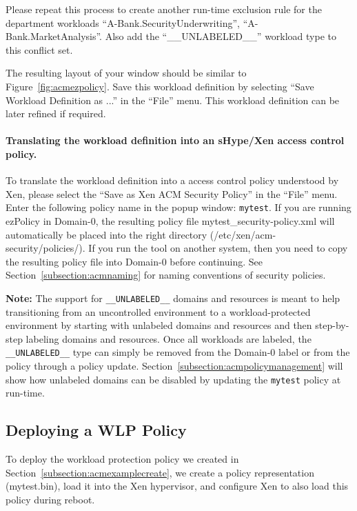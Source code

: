 \documentclass[11pt,twoside,final,openright]{report}
\begin{document}
Please repeat this process to create another run-time exclusion rule
for the department workloads ``A-Bank.SecurityUnderwriting'',
``A-Bank.MarketAnalysis''. Also add the ``\_\_UNLABELED\_\_''
workload type to this conflict set.

The resulting layout of your window should be similar to
Figure~\ref{fig:acmezpolicy}. Save this workload definition by
selecting ``Save Workload Definition as ...'' in the ``File'' menu.
This workload definition can be later refined if required.

\paragraph{Translating the workload definition into an sHype/Xen access
  control policy.} To translate the workload definition into a access
control policy understood by Xen, please select the ``Save as Xen ACM
Security Policy'' in the ``File'' menu. Enter the following policy
name in the popup window: \verb|mytest|. If you are running ezPolicy in
Domain-0, the resulting policy file mytest\_security-policy.xml will
automatically be placed into the right directory (/etc/xen/acm-security/policies/).
If you run the tool on another system, then you need to copy the
resulting policy file into Domain-0 before continuing.  See
Section~\ref{subsection:acmnaming} for naming conventions of security
policies.

\begin{scriptsize}
\textbf{Note:} The support for \verb|__UNLABELED__| domains and
resources is meant to help transitioning from an uncontrolled
environment to a workload-protected environment by starting with
unlabeled domains and resources and then step-by-step labeling domains
and resources. Once all workloads are labeled, the \verb|__UNLABELED__|
type can simply be removed from the Domain-0 label or from the policy
through a policy update. Section~\ref{subsection:acmpolicymanagement} will
show how unlabeled domains can be disabled by updating the
\verb|mytest| policy at run-time.
\end{scriptsize}

\subsection{Deploying a WLP Policy}
\label{subsection:acmexampleinstall}
To deploy the workload protection policy we created in
Section~\ref{subsection:acmexamplecreate}, we create a policy
representation (mytest.bin), load it into the Xen
hypervisor, and configure Xen to also load this policy during
reboot.
\end{document}
